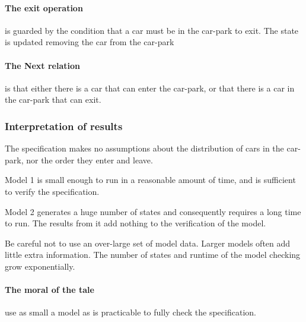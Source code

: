 \documentclass[12pt]{article}
\begin{document}
\paragraph{The exit operation} is guarded by the condition
that a car must be in the car-park to exit.  The state is updated removing
the car from the car-park

\paragraph{The Next relation} is that either there is a car that can enter the
car-park, or that there is a car in the car-park that can exit.

\subsubsection{Interpretation of results}
The specification makes no assumptions about the distribution of cars in the
car-park, nor the order they enter and leave.

Model 1 is small enough to run in a reasonable amount of time, and is
sufficient to verify the specification.

Model 2 generates a huge number of states and consequently requires a long
time to run.  The results from it add nothing to the verification of the
model.  

\begin{infobox}{\warning}
	Be careful not to use an over-large set of model data.  Larger models
	often add little extra information.  The number of states and runtime of
	the model checking  grow exponentially.

	\paragraph{The moral of the tale} use as small a model as is practicable
	to fully check the specification.
\end{infobox}
\end{document}

